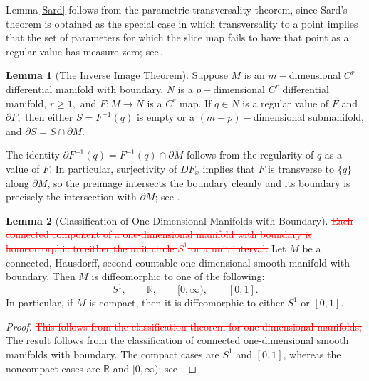 \documentclass[11pt,pdflatex,sn-mathphys-ay]{sn-jnl}%
\theoremstyle{definition}
\theoremstyle{thmstyleone}%
\theoremstyle{thmstyletwo}%
\newtheorem{lemma}{Lemma}%
\theoremstyle{thmstylethree}%
\newcounter{cases}
\newcommand{\del}[1]{\textcolor{red}{\sout{#1}}}
\newcommand{\add}[1]{\textcolor{revisionblue}{#1}}
\begin{document}
	Lemma\,\ref{Sard} follows from the parametric transversality theorem, since Sard’s theorem is obtained as the special case in which transversality to a point implies that the set of parameters for which the slice map fails to have that point as a regular value has measure zero; see\,\cite[Theorem~6.35]{LeeSmoothManifolds2013}.
	\begin{lemma}[The Inverse Image Theorem]\label{inverse}\cite{LeeSmoothManifolds2013} Suppose $M$ is an
		$m-$dimensional $C^r$ differential manifold with boundary, $N$ is a
		$p-$dimensional $C^r$ differential manifold, $r\geqslant 1,$ and $ F
		: M\rightarrow N$ is a $C^r$ map. If $q\in N$ is a regular value of
		$F$ and $\partial F,$ then either $S=F^{-1}(q)$ is empty or a
		$(m-p)-$dimensional submanifold, and $\partial S=S\cap
		\partial M.$
	\end{lemma}
	The identity $\partial F^{-1}(q)=F^{-1}(q)\cap\partial M$ follows from the regularity of $q$ as a value of $F$. In particular, surjectivity of $DF_x$ implies that $F$ is transverse to $\{q\}$ along $\partial M$, so the preimage intersects the boundary cleanly and its boundary is precisely the intersection with $\partial M$; see \cite[Theorem~5.12]{LeeSmoothManifolds2013}.
	
	\begin{lemma}[Classification of One-Dimensional Manifolds with Boundary]
		\label{fenglei}
		\cite[Theorem~1.8]{LeeSmoothManifolds2013}
		\del{Each connected component of a one-dimensional
			manifold with boundary is homeomorphic to
			either the unit circle $S^1$ or a unit interval.}
		\add{Let $M$ be a connected, Hausdorff, second-countable
			one-dimensional smooth manifold with boundary.
			Then $M$ is diffeomorphic to one of the following:
			\[
			S^1,\qquad
			\mathbb{R},\qquad
			[0,\infty),\qquad
			[0,1].
			\]
			In particular, if $M$ is compact, then it is
			diffeomorphic to either $S^1$ or $[0,1]$.}
	\end{lemma}
	\begin{proof}
		\del{This follows from the classification theorem for
			one-dimensional manifolds;}
		\add{The result follows from the classification of connected
			one-dimensional smooth manifolds with boundary.
			The compact cases are $S^1$ and $[0,1]$,
			whereas the noncompact cases are $\mathbb{R}$
			and $[0,\infty)$;} see
		\cite[Theorem~1.8]{LeeSmoothManifolds2013}.
	\end{proof}
	
\end{document}
